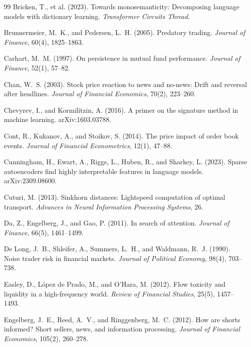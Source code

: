 \documentclass[11pt,a4paper]{article}
\theoremstyle{plain}
\theoremstyle{definition}
\begin{document}
\begin{thebibliography}{99}
Bricken, T., et al. (2023). Towards monosemanticity: Decomposing language models with dictionary learning. \emph{Transformer Circuits Thread}.

Brunnermeier, M.~K., and Pedersen, L.~H. (2005). Predatory trading. \emph{Journal of Finance}, 60(4), 1825--1863.

Carhart, M.~M. (1997). On persistence in mutual fund performance. \emph{Journal of Finance}, 52(1), 57--82.

Chan, W.~S. (2003). Stock price reaction to news and no-news: Drift and reversal after headlines. \emph{Journal of Financial Economics}, 70(2), 223--260.

Chevyrev, I., and Kormilitzin, A. (2016). A primer on the signature method in machine learning. arXiv:1603.03788.

Cont, R., Kukanov, A., and Stoikov, S. (2014). The price impact of order book events. \emph{Journal of Financial Econometrics}, 12(1), 47--88.

Cunningham, H., Ewart, A., Riggs, L., Huben, R., and Sharkey, L. (2023). Sparse autoencoders find highly interpretable features in language models. arXiv:2309.08600.

Cuturi, M. (2013). Sinkhorn distances: Lightspeed computation of optimal transport. \emph{Advances in Neural Information Processing Systems}, 26.

Da, Z., Engelberg, J., and Gao, P. (2011). In search of attention. \emph{Journal of Finance}, 66(5), 1461--1499.

De Long, J.~B., Shleifer, A., Summers, L.~H., and Waldmann, R.~J. (1990). Noise trader risk in financial markets. \emph{Journal of Political Economy}, 98(4), 703--738.

Easley, D., L\'opez de Prado, M., and O'Hara, M. (2012). Flow toxicity and liquidity in a high-frequency world. \emph{Review of Financial Studies}, 25(5), 1457--1493.

Engelberg, J.~E., Reed, A.~V., and Ringgenberg, M.~C. (2012). How are shorts informed? Short sellers, news, and information processing. \emph{Journal of Financial Economics}, 105(2), 260--278.


\end{thebibliography}
\end{document}
